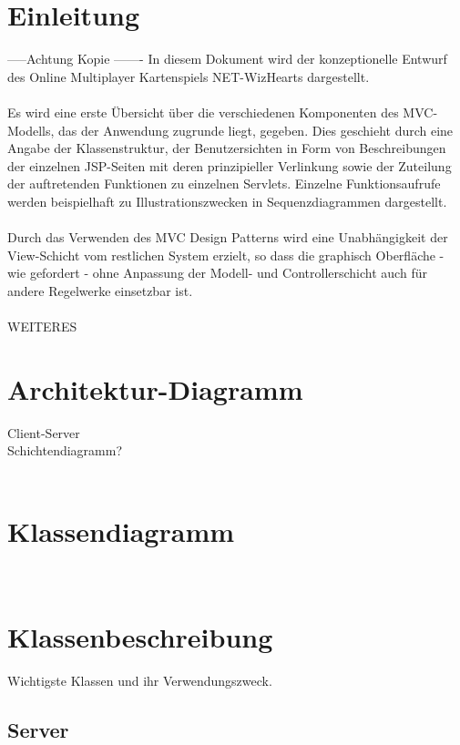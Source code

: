 \documentclass{article}
\begin{document}
\tableofcontents
\newpage

\section{Einleitung}
-----Achtung Kopie -------
In diesem Dokument wird der konzeptionelle Entwurf des Online Multiplayer Kartenspiels NET-WizHearts dargestellt.\\
\ \\
Es wird eine erste Übersicht über die verschiedenen Komponenten des MVC-
Modells, das der Anwendung zugrunde liegt, gegeben. Dies geschieht durch eine
Angabe der Klassenstruktur, der Benutzersichten in Form von Beschreibungen
der einzelnen JSP-Seiten mit deren prinzipieller Verlinkung sowie der Zuteilung
der auftretenden Funktionen zu einzelnen Servlets. Einzelne Funktionsaufrufe
werden beispielhaft zu Illustrationszwecken in Sequenzdiagrammen dargestellt.\\
\ \\
Durch das Verwenden des MVC Design Patterns wird eine Unabhängigkeit der View-Schicht 
vom restlichen System erzielt, so dass die graphisch Oberfläche - wie gefordert - ohne Anpassung 
der Modell- und Controllerschicht auch für andere Regelwerke einsetzbar ist.\\
\  \\
WEITERES
\ \\
\section{Architektur-Diagramm}
Client-Server \\
Schichtendiagramm? \\
\ \\ 
\section{Klassendiagramm}
\ \\
\section{Klassenbeschreibung}
Wichtigste Klassen und ihr Verwendungszweck.
	\subsection{Server}
\end{document}
